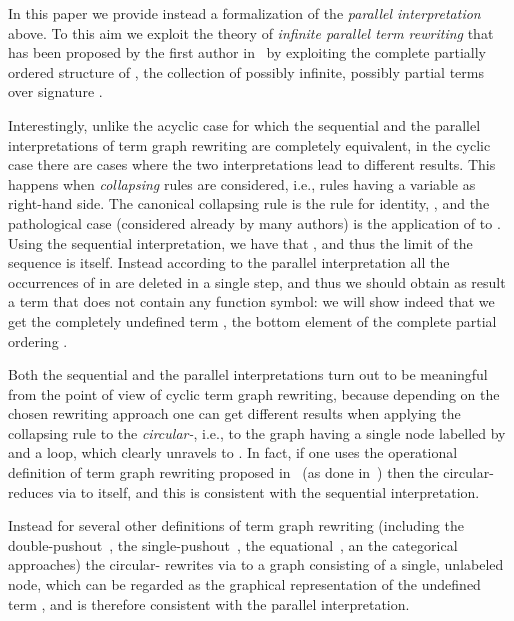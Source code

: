\documentclass{eptcs}
\theoremstyle{plain}
\theoremstyle{definition}
\begin{document}
In this paper we provide instead a formalization of the \emph{parallel
interpretation} above. To this aim we exploit the theory of \emph{infinite
parallel term rewriting} that has been proposed by the first author
in~\cite{Cor:TRC} 
by exploiting the complete partially ordered structure of
, the collection of possibly infinite, possibly partial
terms over signature .

Interestingly, unlike the acyclic case for which the sequential and
the parallel interpretations of term graph rewriting are completely
equivalent, in the cyclic case there are cases
where the two interpretations lead to different results. This
happens when {\em collapsing\/} rules are considered, 
i.e.,
rules having a variable as right-hand side.
The canonical collapsing rule is the rule for identity, , and the pathological case (considered already by many
authors) is the application of  to . Using the sequential
interpretation, we have that , and thus the limit of the
sequence is  itself. Instead according to the parallel
interpretation all the occurrences of  in  are deleted
in a single step, and thus we should obtain as result a term 
that does not contain any function symbol: we will show indeed that we get
the completely undefined term , the bottom element of the
complete partial ordering . 

Both the sequential and the parallel interpretations turn out to be  
meaningful from the point of view of cyclic term graph rewriting, 
because depending on the chosen rewriting approach one can get 
different results when applying the collapsing rule  to the
\emph{circular-}, i.e., to the graph having a single node labelled by
 and a loop, which clearly unravels to .
In fact, if one uses the operational definition of term graph
rewriting proposed in~\cite{BEGKPS:TGR} (as done  
in~\cite{KKSV:AGRS,FRW:CPCR,FW:RCTG}) then 
the circular-  reduces via  to itself, and this is 
consistent with the sequential interpretation.

Instead for several other definitions of term graph rewriting
(including the double-pushout~\cite{HP:ITRJ,CR:HRJR}, the
single-pushout~\cite{Ken:GRSC}, the
equational~\cite{DBLP:journals/fuin/AriolaK96}, an the
categorical~\cite{CG:RCSE} approaches) the circular- rewrites via
 to a graph consisting of a single, unlabeled node, which can be
regarded as the graphical representation of the undefined term ,
and is therefore consistent with the parallel interpretation.
\end{document}
